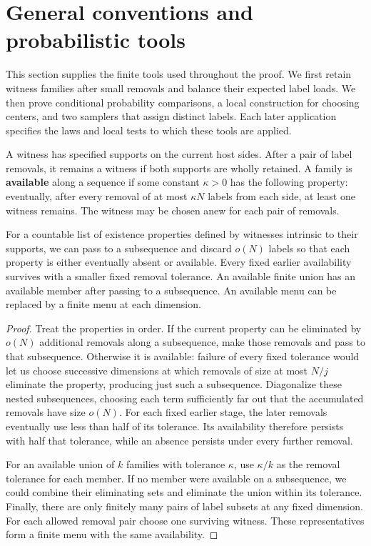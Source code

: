 \section{General conventions and probabilistic tools}
\label{sec:general-conventions-and-probabilistic-tools}

This section supplies the finite tools used throughout the proof. We first
retain witness families after small removals and balance their expected
label loads. We then prove conditional probability comparisons, a local
construction for choosing centers, and two samplers that assign distinct
labels. Each later application specifies the laws and local tests to which
these tools are applied.

\begin{definition}[Availability]
A witness has specified supports on the current host sides. After a pair
of label removals, it remains a witness if both supports are wholly
retained. A family is \textbf{available} along a sequence if some constant
\(\kappa>0\) has the following property: eventually, after every removal
of at most \(\kappa N\) labels from each side, at least one witness remains.
The witness may be chosen anew for each pair of removals.
\end{definition}

\begin{lemma}\label{lem:stabilization}
For a countable list of existence properties defined by witnesses
intrinsic to their supports, we can pass to a subsequence and discard
\(o(N)\) labels so that each property is either eventually absent or
available. Every fixed earlier availability survives with a smaller fixed
removal tolerance. An available finite union has an available member after
passing to a subsequence. An available menu can be replaced by a finite
menu at each dimension.
\end{lemma}

\begin{proof}
Treat the properties in order. If the current property can be eliminated
by \(o(N)\) additional removals along a subsequence, make those removals
and pass to that subsequence. Otherwise it is available: failure of every
fixed tolerance would let us choose successive dimensions at which
removals of size at most \(N/j\) eliminate the property, producing just
such a subsequence. Diagonalize these nested subsequences, choosing each
term sufficiently far out that the accumulated removals have size
\(o(N)\). For each fixed earlier stage, the later removals eventually use
less than half of its tolerance. Its availability therefore persists with
half that tolerance, while an absence persists under every further removal.

For an available union of \(k\) families with tolerance \(\kappa\), use
\(\kappa/k\) as the removal tolerance for each member. If no member were
available on a subsequence, we could combine their eliminating sets and
eliminate the union within its tolerance. Finally, there are only finitely
many pairs of label subsets at any fixed dimension. For each allowed
removal pair choose one surviving witness. These representatives form a
finite menu with the same availability.
\end{proof}

